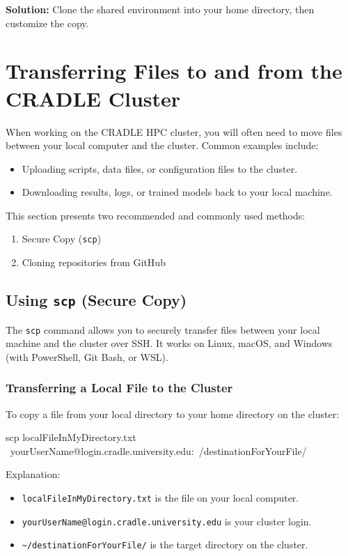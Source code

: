 \documentclass[11pt]{article}
\begin{document}
\textbf{Solution:} Clone the shared environment into your home directory, then customize the copy.


\section{Transferring Files to and from the CRADLE Cluster}
\label{sec:file-transfer}

When working on the CRADLE HPC cluster, you will often need to move files between
your local computer and the cluster. Common examples include:
\begin{itemize}
  \item Uploading scripts, data files, or configuration files to the cluster.
  \item Downloading results, logs, or trained models back to your local machine.
\end{itemize}

This section presents two recommended and commonly used methods:
\begin{enumerate}
  \item Secure Copy (\texttt{scp})
  \item Cloning repositories from GitHub
\end{enumerate}

\subsection{Using \texttt{scp} (Secure Copy)}
\label{subsec:scp}

The \texttt{scp} command allows you to securely transfer files between
your local machine and the cluster over SSH. It works on Linux, macOS, and Windows
(with PowerShell, Git Bash, or WSL).

\subsubsection{Transferring a Local File to the Cluster}

To copy a file from your local directory to your home directory on the cluster:

\begin{codeblock}
scp localFileInMyDirectory.txt \
    yourUserName@login.cradle.university.edu:~/destinationForYourFile/
\end{codeblock}

Explanation:
\begin{itemize}
  \item \texttt{localFileInMyDirectory.txt} is the file on your local computer.
  \item \texttt{yourUserName@login.cradle.university.edu} is your cluster login.
  \item \texttt{\~{}/destinationForYourFile/} is the target directory on the cluster.
\end{itemize}
\end{document}
